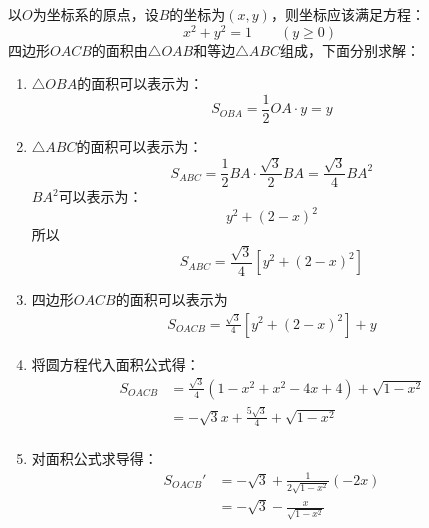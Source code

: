 \documentclass[answers]{exam}
\begin{document}
\begin{questions}
\begin{figure*}[ht]
	\end{figure*}
	\begin{solution}
		以$O$为坐标系的原点，设$B$的坐标为$(x,y)$，则坐标应该满足方程：
		\begin{equation*}
			x^2 + y^2 = 1 \qquad (y \geqslant 0)
		\end{equation*}
		四边形$OACB$的面积由$\triangle{OAB}$和等边$\triangle{ABC}$组成，下面分别求解：
		\begin{enumerate}[label=\zhnum*、]
			\item $\triangle{OBA}$的面积可以表示为：
			      \begin{equation*}
				      S_{OBA} = \frac12 OA \cdot y = y
			      \end{equation*}
			\item $\triangle{ABC}$的面积可以表示为：
			      \begin{equation*}
				      S_{ABC} = \frac12BA\cdot\frac{\sqrt{3}}{2}BA = \frac{\sqrt{3}}{4}BA^2
			      \end{equation*}
			      $BA^2$可以表示为：
			      \begin{equation*}
				      y^2 + (2-x)^2
			      \end{equation*}
			      所以
			      \begin{equation*}
				      S_{ABC} = \frac{\sqrt{3}}{4}[y^2 + (2-x)^2]
			      \end{equation*}
			\item 四边形$OACB$的面积可以表示为
			      \begin{align*}
				      S_{OACB} = \frac{\sqrt{3}}{4}[y^2 + (2-x)^2] + y
			      \end{align*}
			\item 将圆方程代入面积公式得：
			      \begin{align*}
				      S_{OACB} & = \frac{\sqrt{3}}{4}(1-x^2 + x^2 - 4x + 4) + \sqrt{1-x^2} \\
				               & = -\sqrt{3}x + \frac{5\sqrt{3}}{4} + \sqrt{1-x^2}         \\
			      \end{align*}
			\item 对面积公式求导得：
			      \begin{align*}
				      S_{OACB}' & = -\sqrt{3}  + \frac{1}{2\sqrt{1-x^2}}(-2x) \\
				                & =  -\sqrt{3} - \frac{x}{\sqrt{1-x^2}}

\end{align*}
\end{enumerate}
\end{solution}
\end{questions}
\end{document}
